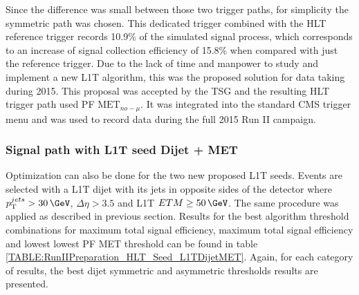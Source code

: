 Since the difference was small between those two trigger paths, for simplicity the symmetric path was chosen. This dedicated trigger combined with the \gls{HLT} reference trigger records 10.9\% of the simulated signal process, which corresponds to an increase of signal collection efficiency of 15.8\% when compared with just the reference trigger. Due to the lack of time and manpower to study and implement a new \gls{L1T} algorithm, this was the proposed solution for data taking during 2015. This proposal was accepted by the \gls{TSG} and the resulting \gls{HLT} trigger path used \gls{PF} $\text{MET}_{no-\mu}$. It was integrated into the standard \gls{CMS} trigger menu and was used to record data during the full 2015 Run II campaign.

\subsubsection{Signal path with L1T seed Dijet + MET}
\label{SECTION:RunIITriggerStudies_HLTAlgorithmDevelopment_L1TDijetMET}


Optimization can also be done for the two new proposed \gls{L1T} seeds. Events are selected with a \gls{L1T} dijet with its jets in opposite sides of the detector where $\pt^{jets}>30\,\GeV$, $\Delta\eta>3.5$ and \gls{L1T} $ETM \geq 50\,\GeV$. The same procedure was applied as described in previous section. Results for the best algorithm threshold combinations for maximum total signal efficiency, maximum total signal efficiency and lowest lowest \gls{PF} \gls{MET} threshold can be found in table \ref{TABLE:RunIIPreparation_HLT_Seed_L1TDijetMET}. Again, for each category of results, the best dijet symmetric and asymmetric \pt thresholds results are presented.


